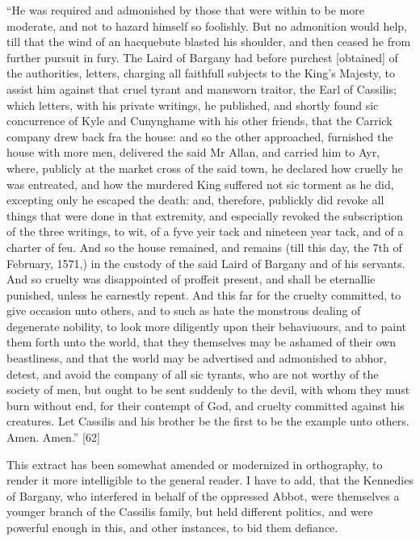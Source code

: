 ``He was required and admonished by those that were within to be more
moderate, and not to hazard himself so foolishly. But no admonition
would help, till that the wind of an hacquebute blasted his shoulder,
and then ceased he from further pursuit in fury. The Laird of Bargany
had before purchest {[}obtained{]} of the authorities, letters, charging
all faithfull subjects to the King's Majesty, to assist him against that
cruel tyrant and mansworn traitor, the Earl of Cassilis; which letters,
with his private writings, he published, and shortly found sic
concurrence of Kyle and Cunynghame with his other friends, that the
Carrick company drew back fra the house: and so the other approached,
furnished the house with more men, delivered the said Mr Allan, and
carried him to Ayr, where, publicly at the market cross of the said
town, he declared how cruelly he was entreated, and how the murdered
King suffered not sic torment as he did, excepting only he escaped the
death: and, therefore, publickly did revoke all things that were done in
that extremity, and especially revoked the subscription of the three
writings, to wit, of a fyve yeir tack and nineteen year tack, and of a
charter of feu. And so the house remained, and remains (till this day,
the 7th of February, 1571,) in the custody of the said Laird of Bargany
and of his servants. And so cruelty was disappointed of proffeit
present, and shall be eternallie punished, unless he earnestly repent.
And this far for the cruelty committed, to give occasion unto others,
and to such as hate the monstrous dealing of degenerate nobility, to
look more diligently upon their behaviuours, and to paint them forth
unto the world, that they themselves may be ashamed of their own
beastliness, and that the world may be advertised and admonished to
abhor, detest, and avoid the company of all sic tyrants, who are not
worthy of the society of men, but ought to be sent suddenly to the
devil, with whom they must burn without end, for their contempt of God,
and cruelty committed against his creatures. Let Cassilis and his
brother be the first to be the example unto others. Amen. Amen.''
{[}62{]}

This extract has been somewhat amended or modernized in orthography, to
render it more intelligible to the general reader. I have to add, that
the Kennedies of Bargany, who interfered in behalf of the oppressed
Abbot, were themselves a younger branch of the Cassilis family, but held
different politics, and were powerful enough in this, and other
instances, to bid them defiance.

